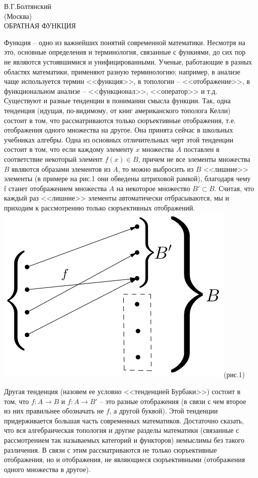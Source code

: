 \documentclass{article}
\begin{document}
\pagestyle{fancy}
В.Г.Болтянский
\\(Москва)
\\ОБРАТНАЯ ФУНКЦИЯ
\par Функция -- одно из важнейших понятий современной математики. Несмотря на это, основные определения и терминология, связанные с функиями, до сих пор не являются устоявшимися и унифицированными. Ученые, работающие в разных областях математики, применяют разную терминологию; например, в анализе чаще используется термин <<функция>>, в топологии -- <<отображение>>, в функциональном анализе -- <<функционал>>, <<оператор>> и т.д. Существуют и разные тенденции в понимании смысла функции. Так, одна тенденция (идущая, по-видимому, от книг американского тополога Келли) состоит в том, что рассматриваются только сюръективные отображения, т.е. отображения одного множества на другое. Она принята сейчас в школьных учебниках алгебры. Одна из основных отличительных черт этой тенденции состоит в том, что если каждому элементу $x$ множества $A$ поставлен в соответствие некоторый элемент $f(x)\in B$, причем не все элементы множества $B$ являются образами элементов из $A$, то можно выбросить из $B$ <<лишние>> элементы (в примере на рис.1 они обведены штриховой рамкой), благодаря чему f станет отображением множества $A$  на некоторое множество $B'\subset B$. Считая, что каждый раз <<лишние>> элементы автоматически отбрасываются, мы и приходим к рассмотрению только сюръективных отображений.
\\
\includegraphics[scale=0.4]{obrfunc.png}(рис.1)
\par Другая тенденция (назовем ее условно <<тенденцией Бурбаки>>) состоит в том, что $f\colon A\to B$ и $f\colon A \to B'$ -- это разные отображения (в связи с чем второе из них правильнее обозначать не $f$, а другой буквой). Этой тенденции придерживается большая часть современных математиков. Достаточно сказать, что вся алгебраическая топология и другие разделы математики (связанные с рассмотрением так называемых категорий и функторов) немыслимы без такого различения. В связи с этим рассматриваются не только сюръективные отображения, но и отображения, не являющиеся сюръективными (отображения одного множества в другое).
\end{document}
